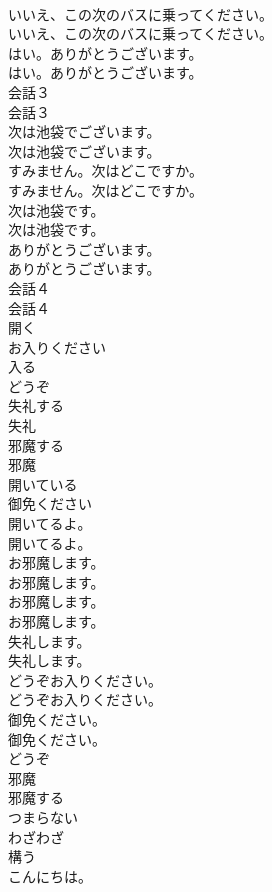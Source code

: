 \documentclass[8pt]{extreport}
\begin{document}
\begin{CJK}{UTF8}{min}
\\	いいえ、この次のバスに乗ってください。	
\\	いいえ、この次のバスに乗ってください。 
\\	はい。ありがとうございます。	
\\	はい。ありがとうございます。 
\\	会話３	
\\	会話３ 
\\	次は池袋でございます。	
\\	次は池袋でございます。 
\\	すみません。次はどこですか。	
\\	すみません。次はどこですか。 
\\	次は池袋です。	
\\	次は池袋です。 
\\	ありがとうございます。	
\\	ありがとうございます。 
\\	会話４	
\\	会話４ 
\\	開く
\\	お入りください
\\	入る
\\	どうぞ
\\	失礼する
\\	失礼
\\	邪魔する
\\	邪魔
\\	開いている
\\	御免ください
\\	開いてるよ。	
\\	開いてるよ。 
\\	お邪魔します。	
\\	お邪魔します。 
\\	お邪魔します。	
\\	お邪魔します。 
\\	失礼します。	
\\	失礼します。 
\\	どうぞお入りください。	
\\	どうぞお入りください。 
\\	御免ください。	
\\	御免ください。 
\\	どうぞ
\\	邪魔
\\	邪魔する
\\	つまらない
\\	わざわざ
\\	構う
\\	こんにちは。	

\end{CJK}
\end{document}
